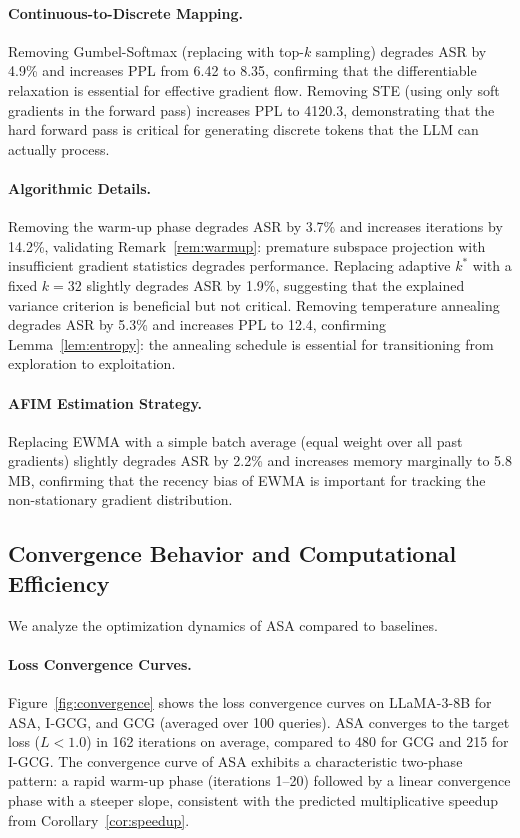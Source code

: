 \documentclass[preprint,12pt]{elsarticle}
\begin{document}
\paragraph{Continuous-to-Discrete Mapping.} Removing Gumbel-Softmax (replacing with top-$k$ sampling) degrades ASR by 4.9\% and increases PPL from 6.42 to 8.35, confirming that the differentiable relaxation is essential for effective gradient flow. Removing STE (using only soft gradients in the forward pass) increases PPL to 4120.3, demonstrating that the hard forward pass is critical for generating discrete tokens that the LLM can actually process.

\paragraph{Algorithmic Details.} Removing the warm-up phase degrades ASR by 3.7\% and increases iterations by 14.2\%, validating Remark~\ref{rem:warmup}: premature subspace projection with insufficient gradient statistics degrades performance. Replacing adaptive $k^*$ with a fixed $k = 32$ slightly degrades ASR by 1.9\%, suggesting that the explained variance criterion is beneficial but not critical. Removing temperature annealing degrades ASR by 5.3\% and increases PPL to 12.4, confirming Lemma~\ref{lem:entropy}: the annealing schedule is essential for transitioning from exploration to exploitation.

\paragraph{AFIM Estimation Strategy.} Replacing EWMA with a simple batch average (equal weight over all past gradients) slightly degrades ASR by 2.2\% and increases memory marginally to 5.8 MB, confirming that the recency bias of EWMA is important for tracking the non-stationary gradient distribution.

\subsection{Convergence Behavior and Computational Efficiency}
\label{sec:convergence_analysis}

We analyze the optimization dynamics of ASA compared to baselines.

\paragraph{Loss Convergence Curves.} Figure~\ref{fig:convergence} shows the loss convergence curves on LLaMA-3-8B for ASA, I-GCG, and GCG (averaged over 100 queries). ASA converges to the target loss ($L < 1.0$) in 162 iterations on average, compared to 480 for GCG and 215 for I-GCG. The convergence curve of ASA exhibits a characteristic two-phase pattern: a rapid warm-up phase (iterations 1--20) followed by a linear convergence phase with a steeper slope, consistent with the predicted multiplicative speedup from Corollary~\ref{cor:speedup}.
\end{document}
